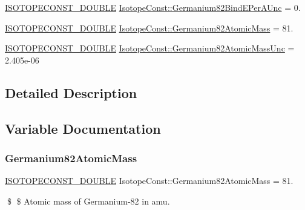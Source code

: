 \begin{DoxyCompactItemize}
\mbox{\hyperlink{group___isotope_const-_macros_ga8f45a7272ce02c0b4c65c44636ed719a}{I\+S\+O\+T\+O\+P\+E\+C\+O\+N\+S\+T\+\_\+\+D\+O\+U\+B\+LE}} \mbox{\hyperlink{group___isotope_const-_germanium-_ge82_gae1a5dccbb88285edc554475f5062d45e}{Isotope\+Const\+::\+Germanium82\+Bind\+E\+Per\+A\+Unc}} = 0.
\item 
\mbox{\hyperlink{group___isotope_const-_macros_ga8f45a7272ce02c0b4c65c44636ed719a}{I\+S\+O\+T\+O\+P\+E\+C\+O\+N\+S\+T\+\_\+\+D\+O\+U\+B\+LE}} \mbox{\hyperlink{group___isotope_const-_germanium-_ge82_gadfd6474603eb80dd3a2b9497cdbe979c}{Isotope\+Const\+::\+Germanium82\+Atomic\+Mass}} = 81.
\item 
\mbox{\hyperlink{group___isotope_const-_macros_ga8f45a7272ce02c0b4c65c44636ed719a}{I\+S\+O\+T\+O\+P\+E\+C\+O\+N\+S\+T\+\_\+\+D\+O\+U\+B\+LE}} \mbox{\hyperlink{group___isotope_const-_germanium-_ge82_gaa32f041a68c52ad49ab4b78d3a94deb2}{Isotope\+Const\+::\+Germanium82\+Atomic\+Mass\+Unc}} = 2.\+405e-\/06
\end{DoxyCompactItemize}


\subsection{Detailed Description}


\subsection{Variable Documentation}
\mbox{\label{group___isotope_const-_germanium-_ge82_gadfd6474603eb80dd3a2b9497cdbe979c}} 
\subsubsection{\texorpdfstring{Germanium82\+Atomic\+Mass}{Germanium82AtomicMass}}
{\footnotesize\ttfamily \mbox{\hyperlink{group___isotope_const-_macros_ga8f45a7272ce02c0b4c65c44636ed719a}{I\+S\+O\+T\+O\+P\+E\+C\+O\+N\+S\+T\+\_\+\+D\+O\+U\+B\+LE}} Isotope\+Const\+::\+Germanium82\+Atomic\+Mass = 81.}

\$ \$ Atomic mass of Germanium-\/82 in amu. \mbox{\label{group___isotope_const-_germanium-_ge82_gaa32f041a68c52ad49ab4b78d3a94deb2}} 
